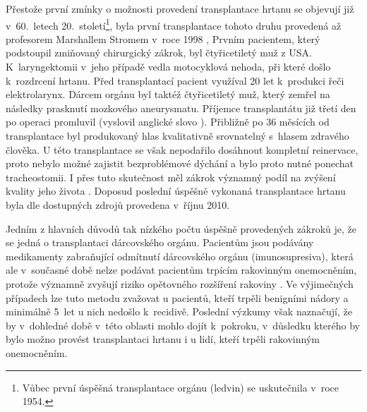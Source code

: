 Přestože první zmínky o možnosti provedení transplantace hrtanu se objevují již v~60.~letech 20.~století\footnote{Vůbec první úspěšná transplantace
orgánu (ledvin) se uskutečnila v~roce 1954.}, byla první transplantace tohoto druhu provedená
až profesorem Marshallem Stromem v~roce 1998 \cite{Narula2011},
Prvním pacientem, který podstoupil zmiňovaný chirurgický zákrok, byl čtyřicetiletý muž z USA.
K~laryngektomii v~jeho případě vedla motocyklová nehoda, při které došlo  k~rozdrcení hrtanu. Před transplantací pacient využíval 20 let  k~produkci řeči elektrolarynx. Dárcem orgánu byl taktéž čtyřicetiletý muž, který zemřel na následky prasknutí mozkového aneurysmatu. Příjemce transplantátu již třetí den po operaci promluvil (vyslovil
anglické slovo ). Přibližně po 36 měsících od transplantace byl
produkovaný hlas kvalitativně srovnatelný s~hlasem zdravého člověka. U této transplantace se však nepodařilo dosáhnout kompletní reinervace, proto nebylo možné zajistit bezproblémové dýchání a bylo proto nutné
ponechat tracheostomii. I přes tuto skutečnost měl zákrok významný podíl na zvýšení kvality jeho života
\cite{Strome2001}. Doposud poslední úspěšně vykonaná transplantace hrtanu byla
dle dostupných zdrojů provedena v~říjnu 2010.



Jedním z hlavních důvodů tak nízkého počtu úspěšně provedených zákroků je, že se jedná o transplantaci dárcovského orgánu. Pacientům jsou podávány medikamenty zabraňující odmítnutí dárcovského orgánu (imunosupresiva), která ale v~současné době nelze podávat pacientům trpícím rakovinným onemocněním, protože významně zvyšují riziko opětovného rozšíření rakoviny \cite{Narula2011}. Ve výjimečných případech lze tuto metodu zvažovat u pacientů, kteří trpěli benigními nádory a minimálně 5~let u nich nedošlo  k~recidivě.
Poslední výzkumy však naznačují, že by v~dohledné době v~této oblasti mohlo dojít  k~pokroku, v~důsledku kterého by bylo možno provést transplantaci hrtanu i u lidí, kteří trpěli rakovinným onemocněním.

